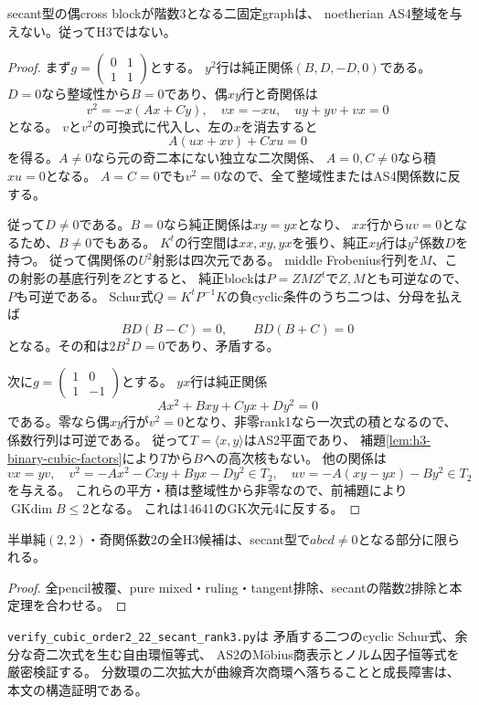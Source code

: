 \begin{theorem}\label{thm:h3-order2-22-secant-rank3-exclusion}
secant型の偶cross blockが階数3となる二固定graphは、
noetherian AS4整域を与えない。従ってH3ではない。
\end{theorem}
\begin{proof}
まず$g=\left(\begin{smallmatrix}0&1\\1&1\end{smallmatrix}\right)$とする。
$y^2$行は純正関係$(B,D,-D,0)$である。
$D=0$なら整域性から$B=0$であり、偶$xy$行と奇関係は
\[
 v^2=-x(Ax+Cy),\quad vx=-xu,\quad uy+yv+vx=0
\]
となる。
$v$と$v^2$の可換式に代入し、左の$x$を消去すると
\[
 A(ux+xv)+Cxu=0
\]
を得る。$A\ne0$なら元の奇二本にない独立な二次関係、
$A=0,C\ne0$なら積$xu=0$となる。
$A=C=0$でも$v^2=0$なので、全て整域性またはAS4関係数に反する。

従って$D\ne0$である。$B=0$なら純正関係は$xy=yx$となり、
$xx$行から$uv=0$となるため、$B\ne0$でもある。
$K^t$の行空間は$xx,xy,yx$を張り、純正$xy$行は$y^2$係数$D$を持つ。
従って偶関係の$U^2$射影は四次元である。
middle Frobenius行列を$M$、この射影の基底行列を$Z$とすると、
純正blockは$P=ZMZ^t$で$Z,M$とも可逆なので、$P$も可逆である。
Schur式$Q=K^tP^{-1}K$の負cyclic条件のうち二つは、分母を払えば
\[
 BD(B-C)=0,\qquad BD(B+C)=0
\]
となる。その和は$2B^2D=0$であり、矛盾する。

次に$g=\left(\begin{smallmatrix}1&0\\1&-1\end{smallmatrix}\right)$とする。
$yx$行は純正関係
\[
 Ax^2+Bxy+Cyx+Dy^2=0
\]
である。零なら偶$xy$行が$v^2=0$となり、非零rank1なら一次式の積となるので、
係数行列は可逆である。
従って$T=\langle x,y\rangle$はAS2平面であり、
補題\ref{lem:h3-binary-cubic-factors}により$T$から$B$への高次核もない。
他の関係は
\[
 vx=yv,\quad
 v^2=-Ax^2-Cxy+Byx-Dy^2\in T_2,\quad
 uv=-A(xy-yx)-By^2\in T_2
\]
を与える。
これらの平方・積は整域性から非零なので、前補題により$\operatorname{GKdim}B\le2$となる。
これは14641のGK次元4に反する。
\end{proof}

\begin{corollary}\label{cor:h3-order2-22-only-invertible-secant}
半単純$(2,2)$・奇関係数2の全H3候補は、secant型で$abcd\ne0$となる部分に限られる。
\end{corollary}
\begin{proof}
全pencil被覆、pure mixed・ruling・tangent排除、secantの階数2排除と本定理を合わせる。
\end{proof}

\texttt{verify\_cubic\_order2\_22\_secant\_rank3.py}は
矛盾する二つのcyclic Schur式、余分な奇二次式を生む自由環恒等式、
AS2のM\"obius商表示とノルム因子恒等式を厳密検証する。
分数環の二次拡大が曲線斉次商環へ落ちることと成長障害は、本文の構造証明である。
